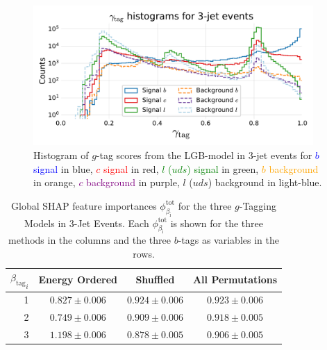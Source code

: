 \begin{figure}[h!]
    \includegraphics[width=0.95\textwidth, trim=10 10 10 45, clip]{figures/quarks/gtag-histogram-sigbkg-down_sample=1.00-ML_vars=vertex-selection=b-ejet_min=4-n_iter_RS_lgb=99-n_iter_RS_xgb=9-cdot_cut=0.90-version=19-njet=3.pdf}
    \caption[Distribution of $g$-Tag Scores in 3-Jet Events for Signal and Background]
            {Histogram of $g$-tag scores from the LGB-model in 3-jet events for \textcolor{blue}{$b$ signal} in blue, \textcolor{red}{$c$ signal} in red, \textcolor{green}{$l$ ($uds$) signal} in green, \textcolor{orange}{$b$ background} in orange, \textcolor{purple}{$c$ background} in purple, \textcolor{light-blue}{$l$ ($uds$) background} in light-blue.
            } 
    \label{fig:q:gtag_scores_3j_sig_bkg}
  \end{figure}



\begin{table}[]
    \centerfloat
    \begin{tabular}{@{}rccc@{}}
    ${\beta_\mathrm{tag}}_i$  & Energy Ordered & Shuffled & All Permutations \\ \midrule
  1 & $ 0.827 \pm 0.006 $  &  $ 0.924 \pm 0.006 $  &  $ 0.923 \pm 0.006 $  \\
  2 & $ 0.749 \pm 0.006 $  &  $ 0.909 \pm 0.006 $  &  $ 0.918 \pm 0.005 $  \\
  3 & $ 1.198 \pm 0.006 $  &  $ 0.878 \pm 0.005 $  &  $ 0.906 \pm 0.005 $  \\
  \end{tabular}
  \caption[Global SHAP Feature Importances for the $g$-Tagging Models in 3-Jet Events]{Global SHAP feature importances $\phi^\mathrm{tot}_{\beta_\mathrm{i}}$ for the three $g$-Tagging Models in 3-Jet Events. Each $\phi^\mathrm{tot}_{\beta_\mathrm{i}}$ is shown for the three methods in the columns and the three $b$-tags as variables in the rows.}
  \label{table:q:shap_g_taggging_global_3j}
\end{table}

